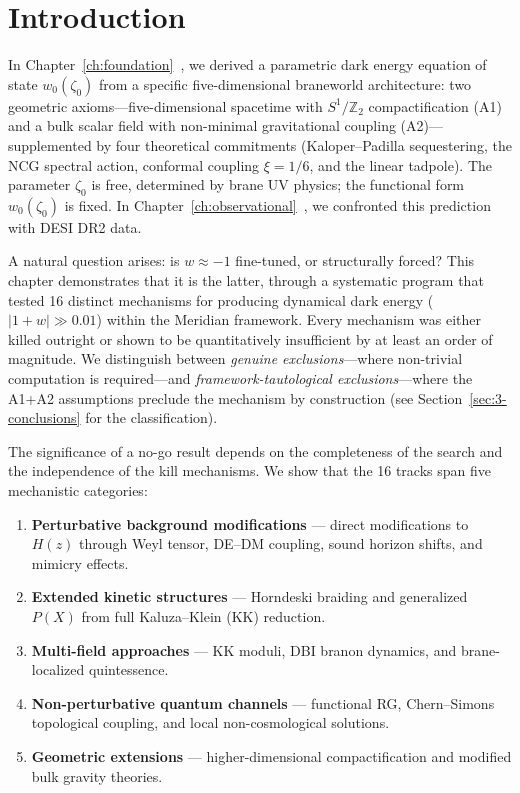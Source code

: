 \section{Introduction}
\label{sec:3-intro}

In Chapter~\ref{ch:foundation}~\cite{ch3:paper1}, we derived a parametric dark energy equation of state $w_0(\zeta_0)$ from a specific five-dimensional braneworld architecture: two geometric axioms---five-dimensional spacetime with $S^1/\mathbb{Z}_2$ compactification (A1) and a bulk scalar field with non-minimal gravitational coupling (A2)---supplemented by four theoretical commitments (Kaloper--Padilla sequestering, the NCG spectral action, conformal coupling $\xi = 1/6$, and the linear tadpole). The parameter $\zeta_0$ is free, determined by brane UV physics; the functional form $w_0(\zeta_0)$ is fixed. In Chapter~\ref{ch:observational}~\cite{ch3:paper2}, we confronted this prediction with DESI DR2 data.

A natural question arises: is $w \approx -1$ fine-tuned, or structurally forced? This chapter demonstrates that it is the latter, through a systematic program that tested 16 distinct mechanisms for producing dynamical dark energy ($|1 + w| \gg 0.01$) within the Meridian framework. Every mechanism was either killed outright or shown to be quantitatively insufficient by at least an order of magnitude. We distinguish between \emph{genuine exclusions}---where non-trivial computation is required---and \emph{framework-tautological exclusions}---where the A1+A2 assumptions preclude the mechanism by construction (see Section~\ref{sec:3-conclusions} for the classification).

The significance of a no-go result depends on the completeness of the search and the independence of the kill mechanisms. We show that the 16 tracks span five mechanistic categories:

\begin{enumerate}
  \item \textbf{Perturbative background modifications} --- direct modifications to $H(z)$ through Weyl tensor, DE--DM coupling, sound horizon shifts, and mimicry effects.
  \item \textbf{Extended kinetic structures} --- Horndeski braiding and generalized $P(X)$ from full Kaluza--Klein (KK) reduction.
  \item \textbf{Multi-field approaches} --- KK moduli, DBI branon dynamics, and brane-localized quintessence.
  \item \textbf{Non-perturbative quantum channels} --- functional RG, Chern--Simons topological coupling, and local non-cosmological solutions.
  \item \textbf{Geometric extensions} --- higher-dimensional compactification and modified bulk gravity theories.
\end{enumerate}

